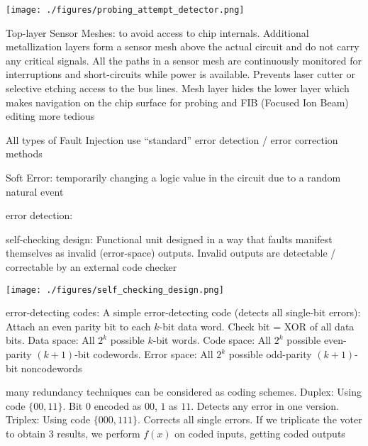 \documentclass[landscape, a4paper]{article}
\begin{document}
\begin{minipage}[t]{0.2\linewidth}
\begin{betterlist}
\begin{betterlist}
			\texttt{[image: ./figures/probing\_attempt\_detector.png]}
			\item \alert{Top-layer Sensor Meshes:} to avoid access to chip internals. Additional metallization layers form a sensor mesh above the actual circuit and do not carry any critical signals. All the paths in a sensor mesh are continuously monitored for interruptions and short-circuits while power is available. Prevents laser cutter or selective etching access to the bus lines. Mesh layer hides the lower layer which makes navigation on the chip surface for probing and FIB (Focused Ion Beam) editing more tedious
		\end{betterlist}
		\item \alert{All types of Fault Injection} use \enquote{standard} error detection / error correction methods
		\begin{betterlist}
			\item \alert{Soft Error:} temporarily changing a logic value in the circuit due to a random natural event
			\item \alert{error detection:}
			\begin{betterlist}
				\item \alert{self-checking design:} Functional unit designed in a way that faults manifest themselves as invalid (error-space) outputs. Invalid outputs are detectable / correctable by an external code checker

				\texttt{[image: ./figures/self\_checking\_design.png]}
				\item \alert{error-detecting codes:}  A simple error-detecting code (detects all single-bit errors): Attach an even parity bit to each $k$-bit data word. Check bit = XOR of all data bits. \alert{Data space:} All $2^k$ possible $k$-bit words. \alert{Code space:} All $2^k$ possible even-parity $(k + 1)$-bit codewords. \alert{Error space:} All $2^k$ possible odd-parity $(k + 1)$-bit noncodewords

				\begin{betterlist}
					\item many redundancy techniques can be considered as coding schemes. \alert{Duplex:} Using code $\{00, 11\}$. Bit $0$ encoded as $00$, $1$ as $11$. Detects any error in one version. \alert{Triplex:} Using code $\{000, 111\}$. Corrects all single errors. If we triplicate the voter to obtain 3 results, we perform $f(x)$ on coded inputs, getting coded outputs


\end{betterlist}
\end{betterlist}
\end{betterlist}
\end{betterlist}
\end{minipage}
\end{document}

